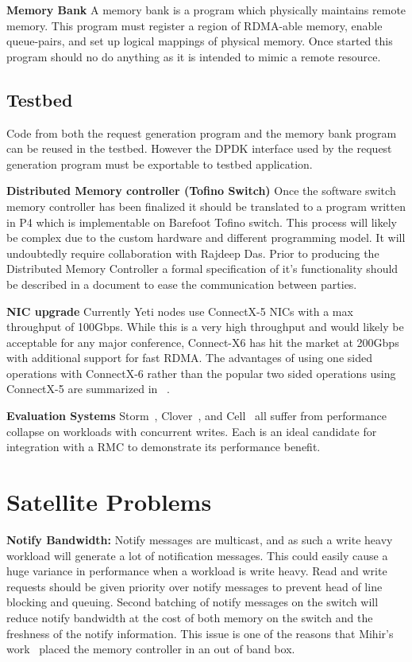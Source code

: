 \textbf{Memory Bank} A memory bank is a program which physically
maintains remote memory. This program must register a region of
RDMA-able memory, enable queue-pairs, and set up logical mappings of
physical memory. Once started this program should no do anything as it
is intended to mimic a remote resource.

\subsection{Testbed}
Code from both the request generation program and the memory bank
program can be reused in the testbed. However the DPDK interface used
by the request generation program must be exportable to testbed
application.

\textbf{Distributed Memory controller (Tofino Switch)}
Once the software switch memory controller has been finalized it
should be translated to a program written in P4 which is
implementable on Barefoot Tofino switch. This process will likely be
complex due to the custom hardware and different programming model. It
will undoubtedly require collaboration with Rajdeep Das. Prior to
producing the Distributed Memory Controller a formal specification of
it's functionality should be described in a document to ease the
communication between parties.

\textbf{NIC upgrade} Currently Yeti nodes use ConnectX-5 NICs with a
max throughput of 100Gbps. While this is a very high throughput and
would likely be acceptable for any major conference, Connect-X6 has
hit the market at 200Gbps with additional support for fast RDMA. The
advantages of using one sided operations with ConnectX-6 rather than
the popular two sided operations using ConnectX-5 are summarized in
~\cite{storm}.

\textbf{Evaluation Systems}
Storm~\cite{storm}, Clover~\cite{clover}, and Cell~\cite{cell} all
suffer from performance collapse  on workloads with concurrent writes.
Each is an ideal candidate for integration with a RMC to demonstrate
its performance benefit.


\section{Satellite Problems} 

\textbf{Notify Bandwidth:}
Notify messages are multicast, and as such a write heavy workload will
generate a lot of notification messages.  This could easily cause a
huge variance in performance when a workload is write heavy. Read and
write requests should be given priority over notify messages to prevent
head of line blocking and queuing. Second batching of notify messages
on the switch will reduce notify bandwidth at the cost of both memory
on the switch and the freshness of the notify information. This issue
is one of the reasons that Mihir's work~\cite{254120} placed the
memory controller in an out of band box.


